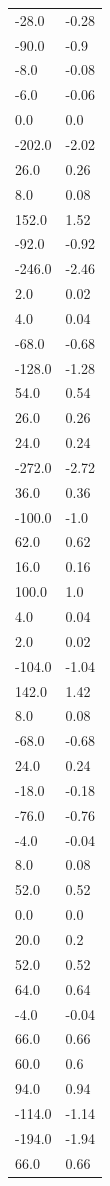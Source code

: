 \begin{longtable}{ll}
-28.0 & -0.28 \\
-90.0 & -0.9 \\
-8.0 & -0.08 \\
-6.0 & -0.06 \\
0.0 & 0.0 \\
-202.0 & -2.02 \\
26.0 & 0.26 \\
8.0 & 0.08 \\
152.0 & 1.52 \\
-92.0 & -0.92 \\
-246.0 & -2.46 \\
2.0 & 0.02 \\
4.0 & 0.04 \\
-68.0 & -0.68 \\
-128.0 & -1.28 \\
54.0 & 0.54 \\
26.0 & 0.26 \\
24.0 & 0.24 \\
-272.0 & -2.72 \\
36.0 & 0.36 \\
-100.0 & -1.0 \\
62.0 & 0.62 \\
16.0 & 0.16 \\
100.0 & 1.0 \\
4.0 & 0.04 \\
2.0 & 0.02 \\
-104.0 & -1.04 \\
142.0 & 1.42 \\
8.0 & 0.08 \\
-68.0 & -0.68 \\
24.0 & 0.24 \\
-18.0 & -0.18 \\
-76.0 & -0.76 \\
-4.0 & -0.04 \\
8.0 & 0.08 \\
52.0 & 0.52 \\
0.0 & 0.0 \\
20.0 & 0.2 \\
52.0 & 0.52 \\
64.0 & 0.64 \\
-4.0 & -0.04 \\
66.0 & 0.66 \\
60.0 & 0.6 \\
94.0 & 0.94 \\
-114.0 & -1.14 \\
-194.0 & -1.94 \\
66.0 & 0.66 \\

\end{longtable}
